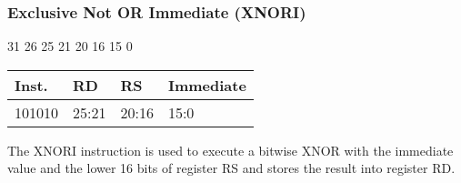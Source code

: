 \documentclass[12pt]{article}
\begin{document}

    \newpage
    \subsubsection{Exclusive Not OR Immediate (XNORI)}
    
    \hspace{1.6cm}31 \hspace{1.15cm}26 \hspace{.05cm}25 \hspace{.8cm}21 \hspace{.05cm}20 \hspace{.8cm}16 \hspace{.05cm}15 \hspace{6.4cm}0
    \vspace{-.25cm}
    \begin{center}
        \begin{tabular}{ |p{1.8cm}|p{1.5cm}|p{1.5cm}|p{6.8cm}| }
            \hline
            \textbf{Inst.} & \textbf{RD} &  \textbf{RS} & \textbf{Immediate}\\
            \hline
            101010& 25:21 & 20:16 &15:0\\
            \hline
        \end{tabular}
    \end{center}
    
    \noindent
    The XNORI instruction is used to execute a bitwise XNOR with the immediate value and the lower 16 bits of register RS and stores the result into register RD. 
    
\end{document}
